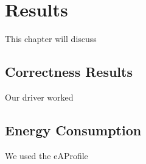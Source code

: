 \chapter{Results}
This chapter will discuss 

\section{Correctness Results}
Our driver worked 

\section{Energy Consumption}
We used the eAProfile 
